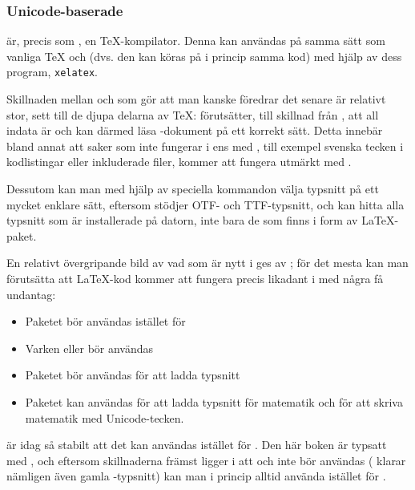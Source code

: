 \documentclass[lang=sv,ptsize=10pt,font=none,nomath,titles=bf,../../a4.tex]{subfiles}
\begin{document}
\subsubsection{Unicode-baserade \XeTeX}
\XeTeX är, precis som \pdfLaTeX, en \TeX-kompilator. Denna kan användas
på samma sätt som vanliga \TeX{} och \pdfLaTeX (dvs. den kan köras på i
princip samma kod) med hjälp av dess program, \texttt{xelatex}.

Skillnaden mellan \pdfLaTeX{} och \XeTeX som gör att man kanske föredrar
det senare är relativt stor, sett till de djupa delarna av \TeX: \XeTeX 
förutsätter, till skillnad från \pdfLaTeX, att all indata är \UTF och kan
därmed läsa \UTF-dokument på ett korrekt sätt. Detta innebär bland annat
att saker som inte fungerar i \pdfLaTeX ens med , till
exempel svenska tecken i kodlistingar eller inkluderade filer, kommer att
fungera utmärkt med \XeTeX.

Dessutom kan man med hjälp av speciella kommandon välja typsnitt på ett
mycket enklare sätt, eftersom \XeTeX stödjer \textsc{OTF}- och
\textsc{TTF}-typsnitt, och kan hitta alla typsnitt som är installerade
på datorn, inte bara de som finns i form av \LaTeX-paket.

En relativt övergripande bild av vad som är nytt i \XeTeX ges av
\textcite{Robertson11}; för det mesta kan man förutsätta att \LaTeX-kod
kommer att fungera precis likadant i \XeTeX med några få undantag:
\begin{itemize}
	\item Paketet  bör användas istället för 
	\item Varken  eller  bör användas
	\item Paketet  bör användas för att ladda typsnitt
	\item Paketet  kan användas för att ladda typsnitt
		  för matematik och för att skriva matematik med Unicode-tecken.
\end{itemize}

\XeTeX är idag så stabilt att det kan användas istället för \pdfLaTeX.
Den här boken är typsatt med \XeTeX, och eftersom skillnaderna främst
ligger i att  och  inte bör användas (\XeTeX
klarar nämligen även gamla \pdfLaTeX-typsnitt) kan man i princip alltid
använda \XeTeX istället för \pdfLaTeX.
\end{document}
